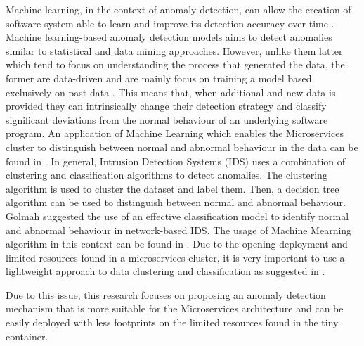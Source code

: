 \documentclass[sigconf]{acmart}
\begin{document}
Machine learning, in the context of  anomaly detection, can allow the creation of  software system able to learn and improve its detection accuracy over time \cite{bujlow2012method}.
Machine learning-based anomaly detection models aims to detect anomalies similar to statistical and data mining approaches. However, unlike them latter which tend to focus on understanding the process that generated the data, the former are data-driven and are mainly focus on training a model based exclusively on past data \cite{Patcha:2007hja}. This means that, when additional and new data is provided they can intrinsically change their detection strategy and classify significant deviations from the normal behaviour of an underlying software program.
An application of Machine Learning which enables the Microservices cluster to distinguish between normal and abnormal behaviour in the data can be found in \cite{Buczak:2016kt}. 
In general, Intrusion Detection Systems (IDS) uses a combination of clustering and classification algorithms to detect anomalies. The clustering algorithm is used to cluster the dataset and label them. Then, a decision tree algorithm can be used to distinguish between normal and abnormal behaviour.
Golmah \cite{golmah2014efficient} suggested the use of an effective classification model to identify normal and abnormal behaviour in network-based IDS. The usage of Machine Mearning algorithm  in this context can be found in  \cite{golmah2014efficient,haq2015application,Buczak:2016kt}. Due to the  opening deployment and limited resources found in a microservices cluster, it is very important to use a lightweight approach to data clustering and classification as suggested in \cite{roesch1999snort}.

Due to this issue, this research focuses on proposing an anomaly detection mechanism that is more suitable for the Microservices architecture and can be easily deployed with less footprints on the limited resources found in the tiny container. 

 
\end{document}
